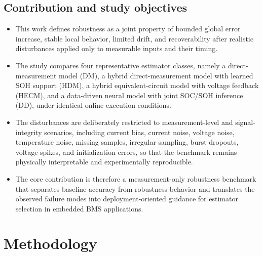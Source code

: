 \documentclass[review,nopreprintline]{elsarticle}
\begin{document}
\subsection{Contribution and study objectives}
\begin{itemize}[leftmargin=*]
    \item This work defines robustness as a joint property of bounded global error increase, stable local behavior, limited drift, and recoverability after realistic disturbances applied only to measurable inputs and their timing.
    \item The study compares four representative estimator classes, namely a direct-measurement model (DM), a hybrid direct-measurement model with learned SOH support (HDM), a hybrid equivalent-circuit model with voltage feedback (HECM), and a data-driven neural model with joint SOC/SOH inference (DD), under identical online execution conditions.
    \item The disturbances are deliberately restricted to measurement-level and signal-integrity scenarios, including current bias, current noise, voltage noise, temperature noise, missing samples, irregular sampling, burst dropouts, voltage spikes, and initialization errors, so that the benchmark remains physically interpretable and experimentally reproducible.
    \item The core contribution is therefore a measurement-only robustness benchmark that separates baseline accuracy from robustness behavior and translates the observed failure modes into deployment-oriented guidance for estimator selection in embedded BMS applications.
\end{itemize}

\section{Methodology}
\end{document}
